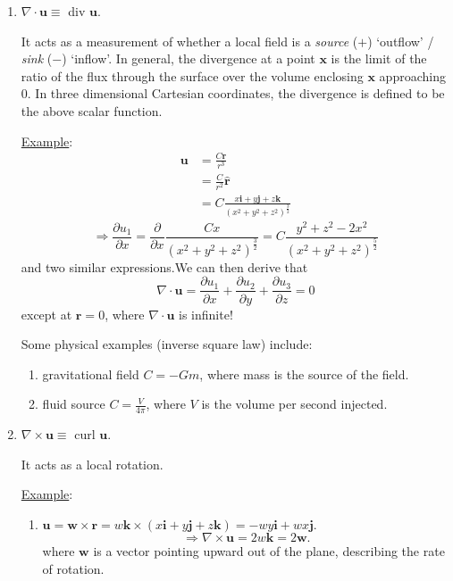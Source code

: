 \documentclass[12pt]{report}
\theoremstyle{definition}
\begin{document}
\begin{enumerate}[label = (\arabic*)]
    \item $\nabla\cdot\mathbf{u} \equiv$ div $\mathbf{u}$.

        It acts as a measurement of whether a local field is a
        \emph{source} ($+$) `outflow' / \emph{sink} ($-$) `inflow'.
        In general, the divergence at a point $\mathbf{x}$ is
        the limit of the ratio of the flux through the surface
        over the volume enclosing $\mathbf{x}$ approaching 0.
        In three dimensional Cartesian coordinates, the divergence
        is defined to be the above scalar function.

        \underline{Example}:\[
            \begin{align*}
                \mathbf{u} & = \frac{C\mathbf{r}}{r^{3}} \\
                           & = \frac{C}{r^{2}} \hat{\mathbf{r}} \\
                           & = C \frac{x\mathbf{i}+y\mathbf{j}+z\mathbf{k}}
                           {{(x^{2}+y^{2}+z^{2})}^{\frac{3}{2}}}
            \end{align*}
        \]\[
            \Rightarrow{}\frac{\partial u_1}{\partial x} 
            = \frac{\partial}{\partial x}\frac{Cx}{{(x^{2}+y^{2}+z^{2})}^{\frac{3}{2}}}
            = C \frac{y^{2}+z^{2}-2x^{2}}{{(x^{2}+y^{2}+z^{2})}^{\frac{5}{2}}}
        \]and two similar expressions.We can then derive that\[
            \nabla\cdot\mathbf{u}=\frac{\partial u_1}{\partial x}
            + \frac{\partial u_2}{\partial y} + \frac{\partial u_3}{\partial z} = 0
        \]except at $\mathbf{r} = 0$, where $\nabla\cdot\mathbf{u}$ is infinite!
        
        Some physical examples (inverse square law) include:
        \begin{enumerate}[label = (\roman*)]
            \item gravitational field $C = -Gm$, where mass is the source of the field.
            \item fluid source $C = \frac{V}{4\pi}$, where $V$ is the volume per second injected.
        \end{enumerate}
        
    \item $\nabla\times\mathbf{u}\equiv$ curl $\mathbf{u}$.

        It acts as a local rotation.

        \underline{Example}:
        \begin{enumerate}[label = (\alph*)]
            \item $\mathbf{u} = \mathbf{w}\times \mathbf{r}
                = w\mathbf{k}\times(x\mathbf{i}+y\mathbf{j}+z\mathbf{k})
                = -wy\mathbf{i} + wx\mathbf{j}$.\[
                    \Rightarrow{}\nabla\times\mathbf{u} = 2w\mathbf{k} = 2\mathbf{w}.
                \]where $\mathbf{w}$ is a vector pointing upward
                out of the plane, describing the rate of rotation.


\end{enumerate}
\end{enumerate}
\end{document}
